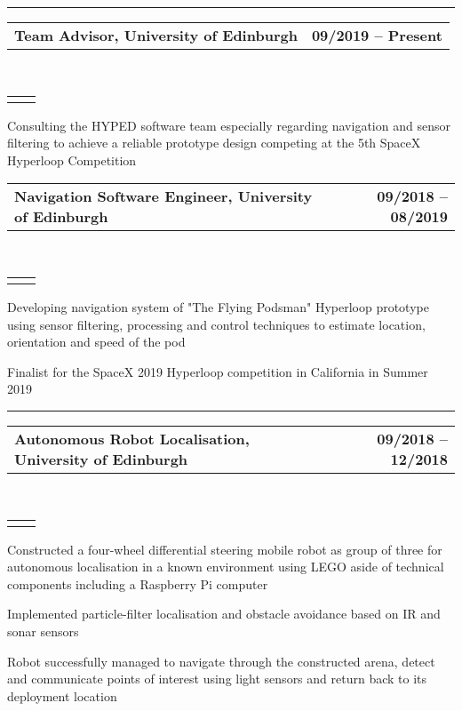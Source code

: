 \documentclass[]{lukas-cv}
\makeatletter
\newcommand{\headerrow}[2]
{\begin{tabular*}{\linewidth}{l@{\extracolsep{\fill}}r}
	\fontspec{Helvetica}\fontsize{12pt}{12pt}\selectfont\bfseries{\color{subheadings}#1} &
	\fontspec{Helvetica}\fontsize{12pt}{12pt}\selectfont\bfseries{\color{subheadings}#2} \\
\end{tabular*}}
\newcommand{\locationrow}[2]
{\begin{tabular*}{\linewidth}{l@{\extracolsep{\fill}}r}
        \color{headings}\scshape\fontspec{Heiti TC Medium}\fontsize{10pt}{12pt}\selectfont{#1}  &
        \color{headings}\scshape\fontspec{Heiti TC Medium}\fontsize{10pt}{12pt}\selectfont{#2}  \\
\end{tabular*}}
\makeatother
\begin{document}
\hrule
\vspace{0.4em}

\noindent
\headerrow{Team Advisor, University of Edinburgh}{09/2019 -- Present}
\\
\locationrow{HYPED -- University of Edinburgh Hyperloop Team}{}
\begin{tightitemize}{1.7em}
    \item Consulting the HYPED software team especially regarding navigation and sensor filtering to achieve a reliable prototype design competing at the 5th SpaceX Hyperloop Competition
\end{tightitemize}
\largesectionsep

\noindent
\headerrow{Navigation Software Engineer, University of Edinburgh}{09/2018 -- 08/2019}
\\
\locationrow{HYPED -- University of Edinburgh Hyperloop Team}{}
\begin{tightitemize}{1.7em}
    \item Developing navigation system of "The Flying Podsman" Hyperloop prototype using sensor filtering, processing and control techniques to estimate location, orientation and speed of the pod
    \item Finalist for the SpaceX 2019 Hyperloop competition in California in Summer 2019
\end{tightitemize}
\largesectionsep




\hrule
\vspace{0.4em}

\noindent
\headerrow{Autonomous Robot Localisation, University of Edinburgh}{09/2018 -- 12/2018}
\\
\locationrow{Group Project for Robotics: Science and Systems Lecture}{}
\begin{tightitemize}{1.7em}
    \item Constructed a four-wheel differential steering mobile robot as group of three for autonomous localisation in a 
    known environment using LEGO aside of technical components including a Raspberry Pi computer
    \item Implemented particle-filter localisation and obstacle avoidance based on IR and sonar sensors
    \item Robot successfully managed to navigate through the constructed arena, detect and communicate points of
    interest using light sensors and return back to its deployment location
\end{tightitemize}
\largesectionsep
\end{document}
